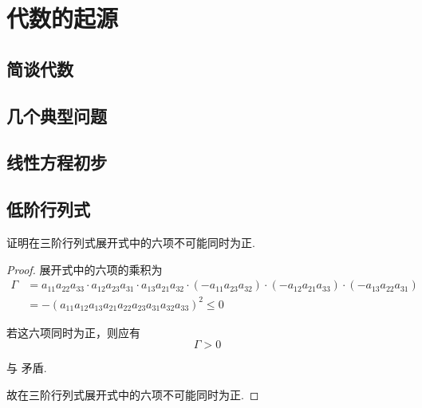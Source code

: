 \cleardoublepage

\chapter{代数的起源}

\section{简谈代数}

\section{几个典型问题}

\section{线性方程初步}

\section{低阶行列式}

证明在三阶行列式展开式中的六项不可能同时为正.
\begin{proof}

展开式中的六项的乘积为
\begin{equation}\label{eq:ch01:sec04:prob02}
\begin{aligned}
    \Gamma &= a_{11}a_{22}a_{33}\cdot{}a_{12}a_{23}a_{31}\cdot{a_{13}}a_{21}a_{32}
    \cdot(-a_{11}a_{23}a_{32})\cdot(-a_{12}a_{21}a_{33})\cdot(-a_{13}a_{22}a_{31}) \\
    &= -(a_{11}a_{12}a_{13}a_{21}a_{22}a_{23}a_{31}a_{32}a_{33})^2 \le 0
\end{aligned}
\end{equation}

若这六项同时为正，则应有
\begin{equation}
    \Gamma > 0
\end{equation}

与 矛盾.

故在三阶行列式展开式中的六项不可能同时为正.

\end{proof}
